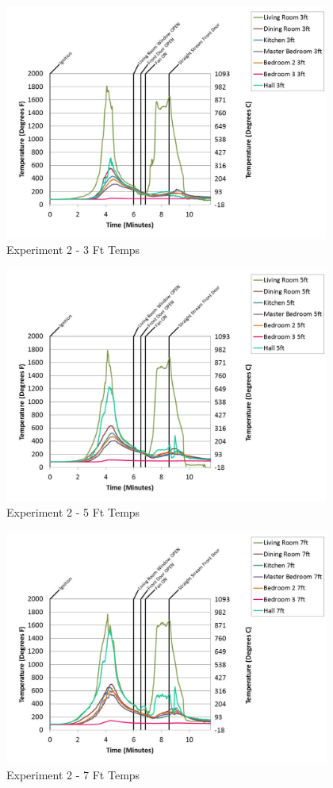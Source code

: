 \documentclass{article}
\begin{document}
\begin{appendices}
	\begin{figure}[h!]
		\centering
		\includegraphics[height=3.05in]{0_Images/Results_Charts/Exp_2_Charts/3FtTemps.pdf}
		\caption{Experiment 2 - 3 Ft Temps}
	\end{figure}
 
	\clearpage

	\begin{figure}[h!]
		\centering
		\includegraphics[height=3.05in]{0_Images/Results_Charts/Exp_2_Charts/5FtTemps.pdf}
		\caption{Experiment 2 - 5 Ft Temps}
	\end{figure}
 

	\begin{figure}[h!]
		\centering
		\includegraphics[height=3.05in]{0_Images/Results_Charts/Exp_2_Charts/7FtTemps.pdf}
		\caption{Experiment 2 - 7 Ft Temps}
	\end{figure}
 

\end{appendices}
\end{document}
